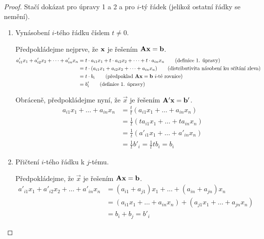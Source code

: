 \begin{proof}
    Stačí dokázat pro úpravy 1 a 2 a pro $i$-tý řádek (jelikož ostatní řádky
    se nemění).
    \begin{enumerate}
        \item Vynásobení $i$-tého řádku číslem $t \neq 0$. 
            
            Předpokládejme nejprve, že $\mathbf{x}$ je 
            řešením $\mathbf{A}\mathbf{x}=\mathbf{b}$.
            \begin{align*}
                a'_{i1}x_1 + a'_{i2}x_2 + \dots + a'_{in}x_n &= 
                t \cdot a_{i1}x_1 + t \cdot a_{i2}x_2 + \dots 
                + t \cdot a_{in}x_n \tag{definice 1. úpravy} \\
                &= t \cdot (a_{i1}x_1 + a_{i2}x_2 + \dots + a_{in}x_n) 
                \tag{distributivita násobení ku sčítání zleva} \\
                &= t \cdot b_i \tag{předpoklad $\mat{A}\vec{x}=\vec{b}$ 
                $i$-té rovnice} \\
                    &= b'_i \tag{definice 1. úpravy}
            \end{align*}

            Obráceně, předpokládejme nyní, že $\vec{x}$ je řešením
            $\mathbf{A'}\mathbf{x} = \mathbf{b'}$.
            \begin{align*}
                a_{i1}x_1 + \dots + a_{in}x_n &= 
                \frac{t}{t}(a_{i1}x_1 + \dots + a_{in}x_n) \\
                &= \frac{1}{t}(ta_{i1}x_1 + \dots + ta_{in}x_n) \\
                &= \frac{1}{t}(a'_{i1}x_1 + \dots + a'_{in}x_n) \\
                &= \frac{1}{t}b'_i 
                = \frac{1}{t}tb_i 
                = b_i
            \end{align*}
        \item Přičtení $i$-tého řádku k $j$-tému.

            Předpokládejme, že $\vec{x}$ je řešením $\mathbf{A}\mathbf{x}=\mathbf{b}$.
            \begin{align*}
                a'_{i1}x_1 + a'_{i2}x_2 + \dots + a'_{in}x_n &= 
                (a_{i1} + a_{j1})x_1 + \dots + (a_{in} + a_{jn})x_n\\
                &= (a_{i1}x_1 + \dots + a_{in}x_n) + (a_{j1}x_1 + \dots +
                a_{jn}x_n) \\
                &= b_i + b_j = b'_i
            \end{align*}


\end{enumerate}
\end{proof}

